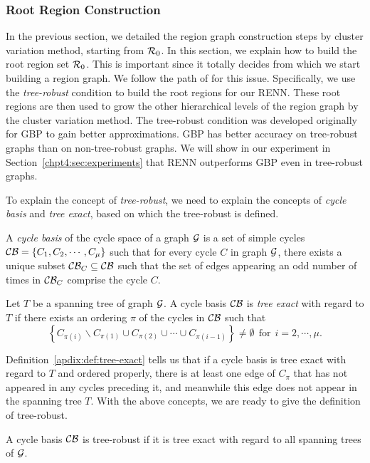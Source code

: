 \subsubsection{Root Region Construction}
\label{sec:criteria-root-regions}
In the previous section, we detailed the region graph construction steps by cluster variation method, starting from $\mathcal{R}_0$. In this section, we explain how to build the root region set $\mathcal{R}_0$. This is important since it totally decides from which we start building a region graph.
We follow the path of \cite{welling2005structured, gelfand2012generalized} for this issue.
Specifically, we use the \textit{tree-robust} condition \cite{gelfand2012generalized} to build the root regions for our RENN. These root regions are then used to grow the other hierarchical levels of the region graph by the cluster variation method. The tree-robust condition was developed originally for GBP to gain better approximations. GBP has better accuracy on tree-robust graphs than on non-tree-robust graphs. We will show in our experiment in Section~\ref{chpt4:sec:experiments} that RENN outperforms GBP even in tree-robust graphs. 


To explain the concept of \textit{tree-robust}, we need to explain the concepts of \textit{cycle basis} and \textit{tree exact}, based on which the tree-robust is defined.
\begin{definition}\label{apdix:def:cycle-basis}
  A \textit{cycle basis} of the cycle space of a graph $\mathcal{G}$ is a
  set of simple cycles $\mathcal{C}\mathcal{B} =\left\{ C_1, C_2, \cdots, C_{\mu}
  \right\}$ such that for every cycle $C$ in graph $\mathcal{G}$, there
  exists a unique subset $\mathcal{C}\mathcal{B}_{C} \subseteq \mathcal{C}\mathcal{B}$ such that the
  set of edges appearing an odd number of times in $\mathcal{C}\mathcal{B}_C$ comprise the cycle $C$.
\end{definition}
\begin{definition}\label{apdix:def:tree-exact}
  Let $T$ be a spanning tree of graph $\mathcal{G}$. A cycle basis $\mathcal{C}\mathcal{B}$ is \textit{tree exact} with regard to $T$ if there exists an ordering $\pi$ of the cycles in $\mathcal{C}\mathcal{B}$ such that
  \begin{equation*}
    \left\{ C_{\pi(i)} \backslash C_{\pi(1)} \cup C_{\pi(2)} \cup \cdots \cup C_{\pi(i-1)} \right\} \neq \emptyset~~\mathrm{for}~~ i=2,\cdots, \mu.
  \end{equation*}
\end{definition}
Definition~\ref{apdix:def:tree-exact} tells us that if a cycle basis is tree exact with regard to $T$ and ordered properly, there is at least one edge of $C_{\pi}$ that has not appeared in any cycles preceding it, and meanwhile this edge does not appear in the spanning tree $T$.
With the above concepts, we are ready to give the definition of tree-robust.
\begin{definition}
  A cycle basis $\mathcal{C}\mathcal{B}$ is tree-robust if it is tree exact with regard to all spanning trees of $\mathcal{G}$.
\end{definition}



